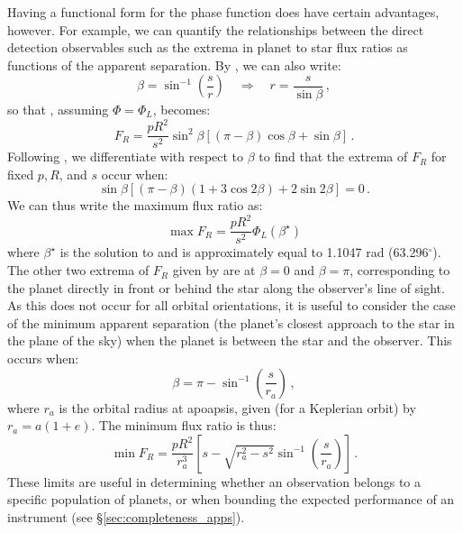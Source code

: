 Having a functional form for the phase function does have certain advantages, however.  For example, we can quantify the relationships between the direct detection observables such as the extrema in planet to star flux ratios as functions of the apparent separation.  By , we can also write:
\begin{equation}
\beta = \sin^{-1}\left(\frac{s}{r}\right)  \quad \Rightarrow \quad r = \frac{s}{\sin\beta} \,,
\end{equation}
so that , assuming $\Phi = \Phi_L$, becomes:
\begin{equation}
F_R = \frac{p R^2}{s^2} \sin^{2}\beta\left[ \left( \pi - \beta\right)\cos\beta + \sin\beta \right] \,.
\end{equation}
Following \citet{brown2005}, we differentiate with respect to $\beta$ to find that the extrema of $F_R$ for fixed $p, R$, and $s$ occur when:
\begin{equation}\label{eq:FRminimization}
\sin\beta \left[ \left( \pi - \beta\right)\left( 1+ 3\cos 2\beta \right)+ 2 \sin 2\beta \right] = 0 \,.
\end{equation}
We can thus write the maximum flux ratio as:
\begin{equation}\label{eq:maxFr}
\max F_R =  \frac{p R^2}{s^2} \Phi_L(\beta^\star)
\end{equation}
where $\beta^\star$ is the solution to  and is approximately equal to 1.1047 rad (63.296$^\circ$).  The other two extrema of $F_R$ given by  are at $\beta = 0$ and $\beta = \pi$, corresponding to the planet directly in front or behind the star along the observer's line of sight.  As this does not occur for all orbital orientations, it is useful to consider the case of the minimum apparent separation (the planet's closest approach to the star in the plane of the sky) when the planet is between the star and the observer.  This occurs when:
\begin{equation}
\beta =  \pi - \sin^{-1}\left(\frac{s}{r_a}\right) \,,
\end{equation}
where $r_a$ is the orbital radius at  apoapsis, given (for a Keplerian orbit) by $r_a = a(1+e)$.  The minimum flux ratio is thus:
\begin{equation}\label{eq:minFr}
\min F_R =  \frac{p R^2}{r_a^3} \left[s - \sqrt{r_a^2 - s^2}\sin^{-1}\left(\frac{s}{r_a}\right)\right]\,.
\end{equation}
These limits are useful in determining whether an observation belongs to a specific population of planets, or when bounding the expected performance of an instrument (see \S\ref{sec:completeness_apps}).

